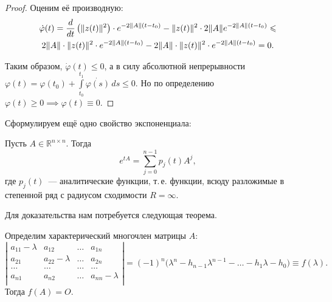 \begin{proof}
    Оценим её производную:
    \begin{multline*}
        \dot{\varphi}(t) = \frac{d}{dt} \left( \lVert z(t) \rVert^2 \right) \cdot e^{-2 \lVert A \rVert(t - t_0)} - \lVert z(t) \rVert^2 \cdot 2 \lVert A \rVert e^{- 2 \lVert A \rVert(t - t_0)} \leqslant \\
        2 \lVert A \rVert \cdot \lVert z(t) \rVert^2 \cdot e^{-2 \lVert A \rVert(t - t_0)} - 2 \lVert A \rVert \cdot \lVert z(t) \rVert^2 \cdot e^{-2 \lVert A \rVert(t - t_0)} = 0.
    \end{multline*}

    Таким образом, $\dot{\varphi}(t) \leqslant 0$, а в силу абсолютной непрерывности $ \varphi(t) = \varphi(t_0) + \int\limits_{t_0}^{t_1} \dot{\varphi(s)} \, ds \leqslant 0$.
    Но по определению $\varphi(t) \geqslant 0 \implies \varphi(t) \equiv 0$.
\end{proof}

Сформулируем ещё одно свойство экспоненциала:
\begin{namedthm}
    Пусть $A \in \mathbb{R}^{n \times n}$.
    Тогда
    \begin{equation*}
        e^{tA} = \sum\limits_{j = 0}^{n - 1} p_j(t) A^j,
    \end{equation*}
    где $p_j(t)$~--- аналитические функции, т.\,е. функции, всюду разложимые в степенной ряд с радиусом сходимости $R = \infty$.
\end{namedthm}

Для доказательства нам потребуется следующая теорема.
\begin{namedthm}
    Определим характерический многочлен матрицы $A$:
    \begin{equation*}
        \left| \begin{matrix}
            a_{11} - \lambda & a_{12} & \ldots & a_{1n} \\
            a_{21} & a_{22} - \lambda & \ldots & a_{2n} \\
            \ldots & \ldots & \ldots & \ldots \\
            a_{n1} & a_{n2} & \ldots & a_{nn} - \lambda \\
        \end{matrix} \right| = 
        (-1)^n \bigl(\lambda^n - h_{n-1} \lambda^{n-1} - \ldots - h_1 \lambda - h_0\bigr) \equiv f(\lambda).
    \end{equation*}
    Тогда $f(A) = O.$
\end{namedthm}

